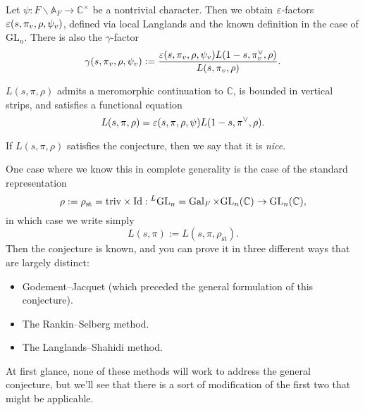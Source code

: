 \documentclass[reqno]{amsart} 
\numberwithin{theorem}{section}
\numberwithin{equation}{section}
\numberwithin{exercise}{section}
\begin{document}
Let $\psi : F \backslash \mathbb{A}_F \rightarrow \mathbb{C}^\times$ be a nontrivial character.  Then we obtain $\varepsilon$-factors $\varepsilon(s, \pi_v, \rho, \psi_v)$, defined via local Langlands and the known definition in the case of $\mathrm{GL}_n$.  There is also the $\gamma$-factor
\begin{equation*}
  \gamma(s, \pi_v, \rho, \psi_v) :=
  \frac{
    \varepsilon(s, \pi_v, \rho, \psi_v)
    L(1 - s, \pi_v^\vee, \rho)
  }{
    L(s, \pi_v, \rho)
  }.
\end{equation*}
\begin{conjecture}[Langlands]\label{conjecture:cq6tho7y7k}
  $L(s, \pi, \rho)$ admits a meromorphic continuation to $\mathbb{C}$, is bounded in vertical strips, and satisfies a functional equation
  \begin{equation*}
    L(s, \pi, \rho) = \varepsilon(s, \pi, \rho, \psi) L(1 - s, \pi^\vee, \rho).
  \end{equation*}
\end{conjecture}
If $L(s, \pi, \rho)$ satisfies the conjecture, then we say that it is \emph{nice}.

One case where we know this in complete generality is the case of the standard representation
\begin{equation*}
  \rho := \rho_{\mathrm{st}} = \mathrm{triv} \times \mathrm{Id} :{}^L \mathrm{GL}_n = \operatorname{Gal}_F \times \mathrm{GL}_n(\mathbb{C}) \rightarrow \mathrm{GL}_n(\mathbb{C}),
\end{equation*}
in which case we write simply
\begin{equation*}
  L(s, \pi) := L(s, \pi, \rho_{\mathrm{st}}).
\end{equation*}
Then the conjecture is known, and you can prove it in three different ways that are largely distinct:
\begin{itemize}
\item Godement--Jacquet (which preceded the general formulation of this conjecture).
\item The Rankin--Selberg method.
\item The Langlands--Shahidi method.
\end{itemize}
At first glance, none of these methods will work to address the general conjecture, but we'll see that there is a sort of modification of the first two that might be applicable.
\end{document}
